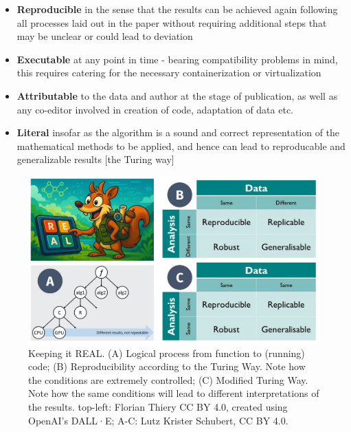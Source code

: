 \documentclass{eceasst}
\begin{document}
\begin{itemize}
    \item \textbf{Reproducible} in the sense that the results can be achieved again following all processes laid out in the paper without requiring additional steps that may be unclear or could lead to deviation
    \item \textbf{Executable} at any point in time - bearing compatibility problems in mind, this requires catering for the necessary containerization or virtualization
    \item \textbf{Attributable} to the data and author at the stage of publication, as well as any co-editor involved in creation of code, adaptation of data etc.
    \item \textbf{Literal} insofar as the algorithm is a sound and correct representation of the mathematical methods to be applied, and hence can lead to reproducable and generalizable results [the Turing way]
\end{itemize}

\begin{figure}[h!]
    \centering
    \includegraphics[width=0.95\linewidth]{ECEASST-LaTeX-Templates/img/REAL.png}
    \caption{Keeping it REAL. (A) Logical process from function to (running) code; (B) Reproducibility according to the Turing Way. Note how the conditions are extremely controlled; (C) Modified Turing Way. Note how the same conditions will lead to different interpretations of the results. top-left: Florian Thiery CC BY 4.0, created using OpenAI’s DALL·E; A-C: Lutz Krister Schubert, CC BY 4.0.}
    \label{fig:real}
\end{figure}
\end{document}
